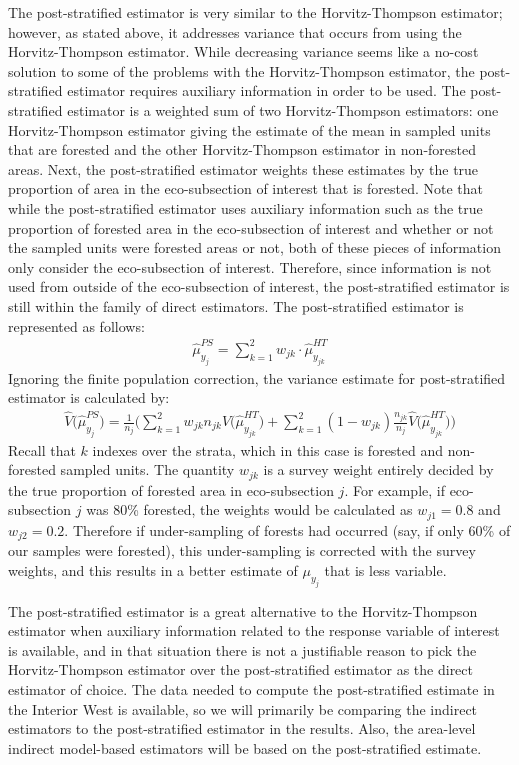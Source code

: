 \documentclass[12pt,twoside]{reedthesis}
\begin{document}
The post-stratified estimator is very similar to the Horvitz-Thompson estimator; however, as stated above, it addresses variance that occurs from using the Horvitz-Thompson estimator. While decreasing variance seems like a no-cost solution to some of the problems with the Horvitz-Thompson estimator, the post-stratified estimator requires auxiliary information in order to be used. The post-stratified estimator is a weighted sum of two Horvitz-Thompson estimators: one Horvitz-Thompson estimator giving the estimate of the mean in sampled units that are forested and the other Horvitz-Thompson estimator in non-forested areas. Next, the post-stratified estimator weights these estimates by the true proportion of area in the eco-subsection of interest that is forested. Note that while the post-stratified estimator uses auxiliary information such as the true proportion of forested area in the eco-subsection of interest and whether or not the sampled units were forested areas or not, both of these pieces of information only consider the eco-subsection of interest. Therefore, since information is not used from outside of the eco-subsection of interest, the post-stratified estimator is still within the family of direct estimators. The post-stratified estimator is represented as follows:
\begin{align}
\hat\mu_{y_j}^{PS} = \sum_{k=1}^{2} w_{jk} \cdot \hat\mu_{y_{jk}}^{HT}
\end{align}
Ignoring the finite population correction, the variance estimate for post-stratified estimator is calculated by:
\begin{align}
\hat V\Big(\hat \mu_{y_j}^{PS}\Big) = 
\frac{1}{n_j} \Bigg( \sum_{k=1}^{2} w_{jk} n_{jk} \hat V\Big(\hat\mu_{y_{jk}}^{HT}\Big) + 
\sum_{k=1}^{2} (1 - w_{jk}) \frac{n_{jk}}{n_j} \hat V\Big(\hat\mu_{y_{jk}}^{HT}\Big) \Bigg)
\end{align}
Recall that \(k\) indexes over the strata, which in this case is forested and non-forested sampled units. The quantity \(w_{jk}\) is a survey weight entirely decided by the true proportion of forested area in eco-subsection \(j\). For example, if eco-subsection \(j\) was 80\% forested, the weights would be calculated as \(w_{j1} = 0.8\) and \(w_{j2} = 0.2\). Therefore if under-sampling of forests had occurred (say, if only 60\% of our samples were forested), this under-sampling is corrected with the survey weights, and this results in a better estimate of \(\mu_{y_j}\) that is less variable.

The post-stratified estimator is a great alternative to the Horvitz-Thompson estimator when auxiliary information related to the response variable of interest is available, and in that situation there is not a justifiable reason to pick the Horvitz-Thompson estimator over the post-stratified estimator as the direct estimator of choice. The data needed to compute the post-stratified estimate in the Interior West is available, so we will primarily be comparing the indirect estimators to the post-stratified estimator in the results. Also, the area-level indirect model-based estimators will be based on the post-stratified estimate.
\end{document}
